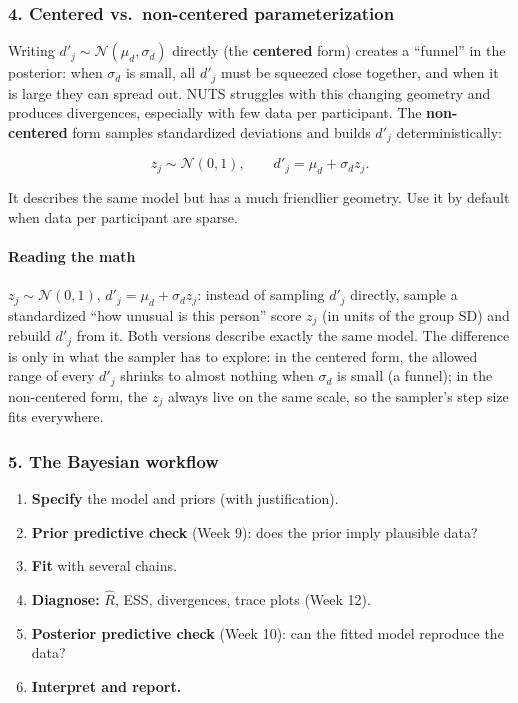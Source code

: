 \subsubsection{4. Centered vs.~non-centered parameterization}

Writing \(d'_j \sim \mathcal{N}(\mu_d, \sigma_d)\) directly (the
\textbf{centered} form) creates a ``funnel'' in the posterior: when
\(\sigma_d\) is small, all \(d'_j\) must be squeezed close together, and
when it is large they can spread out. NUTS struggles with this changing
geometry and produces divergences, especially with few data per
participant. The \textbf{non-centered} form samples standardized
deviations and builds \(d'_j\) deterministically:

\[
z_j \sim \mathcal{N}(0, 1), \qquad d'_j = \mu_d + \sigma_d z_j.
\]

It describes the same model but has a much friendlier geometry. Use it
by default when data per participant are sparse.

\paragraph{Reading the math}

\(z_j \sim \mathcal{N}(0, 1)\), \(d'_j = \mu_d + \sigma_d z_j\): instead
of sampling \(d'_j\) directly, sample a standardized ``how unusual is
this person'' score \(z_j\) (in units of the group SD) and rebuild
\(d'_j\) from it. Both versions describe exactly the same model. The
difference is only in what the sampler has to explore: in the centered
form, the allowed range of every \(d'_j\) shrinks to almost nothing when
\(\sigma_d\) is small (a funnel); in the non-centered form, the \(z_j\)
always live on the same scale, so the sampler's step size fits
everywhere.

\subsubsection{5. The Bayesian workflow}

\begin{enumerate}
\def\labelenumi{\arabic{enumi}.}
\tightlist
\item
  \textbf{Specify} the model and priors (with justification).
\item
  \textbf{Prior predictive check} (Week 9): does the prior imply
  plausible data?
\item
  \textbf{Fit} with several chains.
\item
  \textbf{Diagnose:} \(\hat R\), ESS, divergences, trace plots (Week
  12).
\item
  \textbf{Posterior predictive check} (Week 10): can the fitted model
  reproduce the data?
\item
  \textbf{Interpret and report.}
\end{enumerate}

